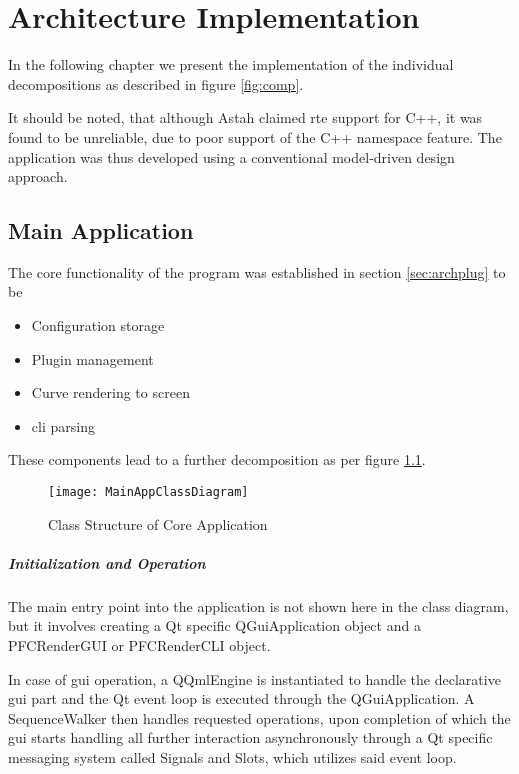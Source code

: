\chapter{Architecture Implementation}
In the following chapter we present the implementation of the individual decompositions as described in figure \ref{fig:comp}.

It should be noted, that although Astah claimed \gls{rte} support for C++, it was found to be unreliable, due to poor support of the C++ namespace feature.
The application was thus developed using a conventional model-driven design approach.

\section{Main Application}
The core functionality of the program was established in section \ref{sec:archplug} to be
\begin{itemize}
	\item Configuration storage
	\item Plugin management
	\item Curve rendering to screen
	\item \gls{cli} parsing
\end{itemize}

These components lead to a further decomposition as per figure \ref{fig:main}.

\begin{figure}[htb]
	\texttt{[image: MainAppClassDiagram]}
	\caption{Class Structure of Core Application}
	\label{fig:main}
\end{figure} 

\paragraph{Initialization and Operation}
The main entry point into the application is not shown here in the class diagram, but it involves creating a Qt specific QGuiApplication object and a PFCRenderGUI or PFCRenderCLI object.

In case of \gls{gui} operation, a QQmlEngine is instantiated to handle the declarative \gls{gui} part and the Qt event loop is executed through the QGuiApplication. A SequenceWalker then handles requested operations, upon completion of which the \gls{gui} starts handling all further interaction asynchronously through a Qt specific messaging system called Signals and Slots, which utilizes said event loop.


